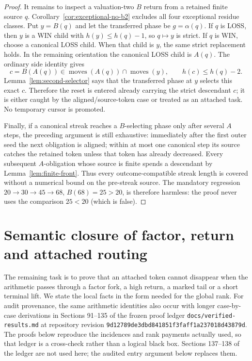 \documentclass[11pt]{article}
\begin{document}
\begin{proof}
It remains to inspect a valuation-two $B$ return from a retained finite
source $q$.  Corollary~\ref{cor:exceptional-no-b2} excludes all four
exceptional residue classes.  Put $y=B(q)$ and let the transferred phase be
$g=\alpha(q)$.  If $q$ is LOSS, then $y$ is a WIN child with
$h(y)\le h(q)-1$, so $q\mapsto y$ is strict.  If $q$ is WIN, choose a
canonical LOSS child.  When that child is $y$, the same strict replacement
holds.  In the remaining orientation the canonical LOSS child is $A(q)$.
The ordinary side identity gives
\[
 c=B(A(q))\in\operatorname{moves}(A(q))\cap\operatorname{moves}(y),
 \qquad h(c)\le h(q)-2.
\]
Lemma~\ref{lem:second-selector} says that the transferred phase at $y$
selects this exact $c$.  Therefore the reset is entered already carrying the
strict descendant $c$; it is either caught by the aligned/source-token case
or treated as an attached task.  No temporary cursor is promoted.

Finally, if a canonical streak reaches a $B$-selecting phase only after
several $A$ steps, the preceding argument is still exhaustive: immediately
after the first outer seed the next obligation is aligned; within at most one
canonical step its source catches the retained token unless that token has
already decreased.  Every subsequent $A$-obligation whose source is finite
spends a descendant by Lemma~\ref{lem:finite-front}.  Thus every
outcome-compatible streak length is covered without a numerical bound on the
pre-streak source.  The mandatory regression
$20\to30\to45\to68$, $B(68)=25>20$, is therefore harmless: the proof never
uses the comparison $25<20$ (which is false).
\end{proof}


\section{Semantic closure of factor, return and attached routing}
\label{sec:P2closed}

The remaining task is to prove that an attached token cannot disappear when
the arithmetic passes through a factor fork, a high return, a marked tail or
a short terminal lift.  We state the local facts in the form needed for the
global rank.  For audit provenance, the same arithmetic identities also occur with longer
case-by-case derivations in Sections 91--135 of the frozen proof ledger
\texttt{docs/verified-results.md} at repository revision
\nolinkurl{9d12789de3dbd841851f3faff1a237018d43879d}.  The proofs below reproduce
the incidences and rank payments actually used, so that ledger is a
cross-check rather than a logical black box.  Sections 137--138 of the ledger
are not used here; the audited entry argument below replaces them.
\end{document}
